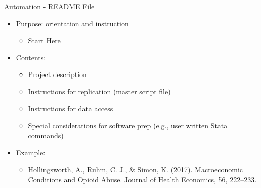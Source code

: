 \documentclass{beamer}
\begin{document}
\begin{frame}{Automation - README File}
    \begin{itemize}
        \item Purpose: orientation and instruction
            \begin{itemize}
                \item Start Here
            \end{itemize}
        \medskip
        \item Contents:
            \begin{itemize}
                \item Project description
                \item Instructions for replication (master script file)
                \item Instructions for data access
                \item Special considerations for software prep (e.g., user written Stata commands)
            \end{itemize}
        \medskip
        \pause\item Example:
            \begin{itemize}
                \item \color{blue} \href{https://github.com/hollina/macroeconomic_conditions_and_opioid_abuse}{Hollingsworth, A., Ruhm, C. J., \& Simon, K. (2017). Macroeconomic Conditions and Opioid Abuse. Journal of Health Economics, 56, 222–233.}
            \end{itemize}
    \end{itemize}
\end{frame}
\end{document}
